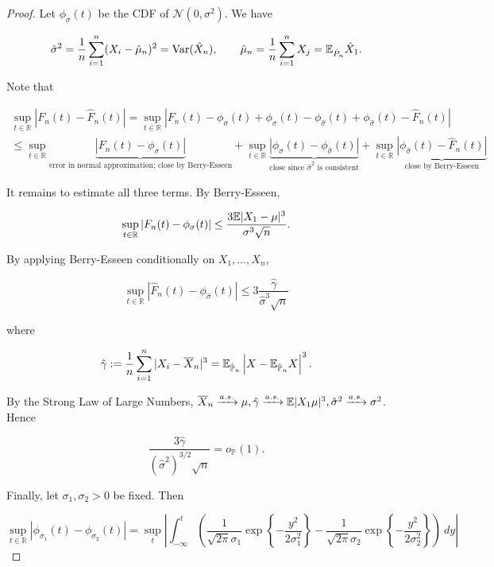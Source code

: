 \begin{proof}



Let \(\phi_\sigma(t)\) be the CDF of \(\mathcal{N}(0, \sigma^2)\). We have

\[
\hat{\sigma}^2 = \frac{1}{n} \sum_{i=1}^n (X_i - \hat{\mu}_n)^2 = \Var( \hat{X}_n), \qquad \hat{\mu}_n = \frac{1}{n} \sum_{i=1}^n X_j = \E_{\hat{P}_n} \hat{X}_1.
\]

Note that 

\begin{multline*}
\sup_{t \in \mathbb{R}} \left|   F_n(t) - \hat{F}_n(t)\right| = \sup_{t \in \mathbb{R}} \left| F_n(t) -  \phi_\sigma(t) + \phi_\sigma(t) - \phi_{\hat{\sigma}}(t) +   \phi_{\hat{\sigma}}(t)  - \hat{F}_n(t) \right| 
\\  \leq \sup_{t \in \mathbb{R}} \underbrace{\left| F_n(t) -  \phi_\sigma(t) \right|}_{\text{error in normal approximation; close by Berry-Esseen}} + \sup_{t \in \mathbb{R}} \underbrace{\left| \phi_\sigma(t) - \phi_{\hat{\sigma}}(t) \right|}_{\text{close since } \hat{\sigma}^2 \text{ is consistent}} +   \sup_{t \in \mathbb{R}} \underbrace{\left| \phi_{\hat{\sigma}}(t)  - \hat{F}_n(t) \right| }_{\text{close by Berry-Esseen}}
\end{multline*}

It remains to estimate all three terms. By Berry-Esseen,

\[
\sup_{t \in \mathbb{R}} \left| F_n(t) -  \phi_\sigma(t) \right| \leq \frac{3 \E |X_1 - \mu|^3}{\sigma^3 \sqrt{n}}.
\]

By applying Berry-Esseen conditionally on \(X_1, \ldots, X_n\),

\[
 \sup_{t \in \mathbb{R}} \left|   \hat{F}_n(t)  - \phi_{\hat{\sigma}}(t)  \right| \leq 3 \frac{\hat{\gamma}}{\hat{\sigma}^3 \sqrt{n}}
\]

where

\[
\hat{\gamma} := \frac{1}{n} \sum_{i=1}^n |X_i - \overline{X}_n|^3 = \E_{\hat{\mathbb{P}}_n} \left|X - \E_{\hat{\mathbb{P}}_n} X \right|^3.
\]

By the Strong Law of Large Numbers, \(\overline{X}_n \xrightarrow{a.s.} \mu, \hat{\gamma} \xrightarrow{a.s.} \E|X_1 \mu|^3, \hat{\sigma}^2 \xrightarrow{a.s.} \sigma^2\). Hence 

\[
\frac{3 \hat{\gamma}}{(\hat{\sigma}^2)^{3/2} \sqrt{n}} = o_{\mathbb{P}}(1).
\]

Finally, let \(\sigma_1, \sigma_2 > 0\) be fixed. Then

\[
\sup_{t \in \mathbb{R}} \left| \phi_{\sigma_1}(t) - \phi_{\sigma_2}(t) \right| = \sup_t \left|  \int_{-\infty}^t  \left( \frac{1}{\sqrt{2 \pi} \sigma_1} \exp \left\{ - \frac{ y^2}{2 \sigma_1^2} \right\} - \frac{1}{\sqrt{2 \pi} \sigma_2} \exp \left\{ - \frac{ y^2}{2 \sigma_2^2} \right\} \right) \ dy \right| 
\]


\end{proof}
